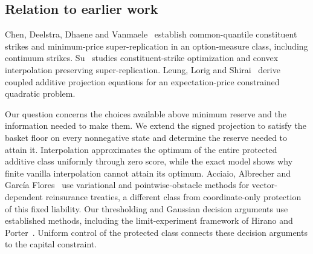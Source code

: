 \documentclass[11pt,a4paper]{amsart}
\theoremstyle{plain}
\theoremstyle{definition}
\theoremstyle{remark}
\begin{document}
\subsection{Relation to earlier work}
Chen, Deelstra, Dhaene and Vanmaele~\cite{ChenEtAl2008} establish common-quantile constituent strikes and minimum-price super-replication in an option-measure class, including continuum strikes. Su~\cite{Su2005} studies constituent-strike optimization and convex interpolation preserving super-replication. Leung, Lorig and Shirai~\cite{LeungLorigShirai2024} derive coupled additive projection equations for an expectation-price constrained quadratic problem.

Our question concerns the choices available above minimum reserve and the information needed to make them. We extend the signed projection to satisfy the basket floor on every nonnegative state and determine the reserve needed to attain it. Interpolation approximates the optimum of the entire protected additive class uniformly through zero score, while the exact model shows why finite vanilla interpolation cannot attain its optimum. Acciaio, Albrecher and Garc\'ia Flores~\cite{AcciaioAlbrecherGarciaFlores2024} use variational and pointwise-obstacle methods for vector-dependent reinsurance treaties, a different class from coordinate-only protection of this fixed liability. Our thresholding and Gaussian decision arguments use established methods, including the limit-experiment framework of Hirano and Porter~\cite{HiranoPorter2005}. Uniform control of the protected class connects these decision arguments to the capital constraint.
\end{document}
